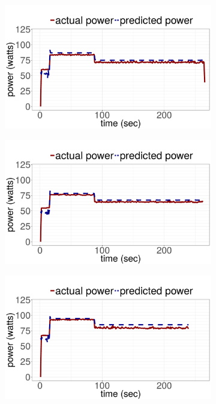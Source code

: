\begin{figure}[ht!]
	\centering
	\begin{subfigure}[b]{.6\textwidth}
  	\includegraphics[width=\textwidth]{power_aware_job_scheduling/figures/predict_blackscholes_catalyst45}
  \end{subfigure}%

	\begin{subfigure}[b]{.6\textwidth}
  	\includegraphics[width=\textwidth]{power_aware_job_scheduling/figures/predict_blackscholes_catalyst79}
	\end{subfigure}%

	\begin{subfigure}[b]{.6\textwidth}
	  \includegraphics[width=\textwidth]{power_aware_job_scheduling/figures/predict_blackscholes_catalyst239}
	\end{subfigure}%


\end{figure}
